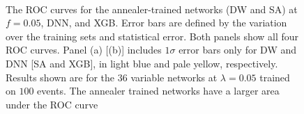 \begin{figure}
\centering
{}\\
  \caption{The ROC curves for the annealer-trained networks (DW and SA) at $f=0.05$, DNN, and XGB. Error bars are defined by the variation over the training sets and statistical error. Both panels show all four ROC curves. Panel (a) [(b)] includes $1\sigma$ error bars only for DW and DNN [SA and XGB], in light blue and pale yellow, respectively. Results shown are for the $36$ variable networks at $\lambda=0.05$ trained on $100$ events. The annealer trained networks have a larger area under the ROC curve}
 \label{fig:ROC_example}
  \end{figure}


